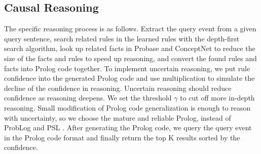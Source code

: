 \subsection{Causal Reasoning}
The specific reasoning process is as follows. Extract the query event from a given query sentence, search related rules in the learned rules with the depth-first search algorithm, look up related facts in Probase and ConceptNet to reduce the size of the facts and rules to speed up reasoning, and convert the found rules and facts into Prolog code together. 
To implement uncertain reasoning, we put rule confidence into the generated Prolog code and 
use multiplication to simulate the decline of the confidence in reasoning.
Uncertain reasoning should reduce confidence as reasoning deepens. We set the threshold $\gamma$ to cut off more in-depth reasoning. 
Small modification of Prolog code generalization is enough to reason with uncertainty, so we choose the mature and reliable Prolog, instead of ProbLog \cite{de2007problog} and PSL \cite{bach:jmlr17}.
After generating the Prolog code, we query the query event in the Prolog code format and finally return the top K results sorted by the confidence.